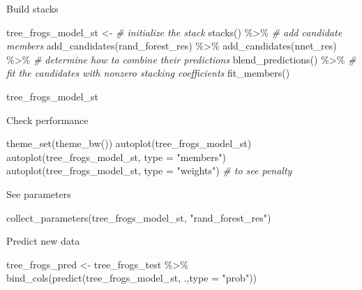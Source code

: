 \documentclass[
]{book}
\newenvironment{Shaded}{\begin{snugshade}}{\end{snugshade}}
\newcommand{\AttributeTok}[1]{\textcolor[rgb]{0.77,0.63,0.00}{#1}}
\newcommand{\CommentTok}[1]{\textcolor[rgb]{0.56,0.35,0.01}{\textit{#1}}}
\newcommand{\FunctionTok}[1]{\textcolor[rgb]{0.00,0.00,0.00}{#1}}
\newcommand{\NormalTok}[1]{#1}
\newcommand{\OtherTok}[1]{\textcolor[rgb]{0.56,0.35,0.01}{#1}}
\newcommand{\SpecialCharTok}[1]{\textcolor[rgb]{0.00,0.00,0.00}{#1}}
\newcommand{\StringTok}[1]{\textcolor[rgb]{0.31,0.60,0.02}{#1}}
\begin{document}
Build stacks

\begin{Shaded}
\begin{Highlighting}[]
\NormalTok{tree\_frogs\_model\_st }\OtherTok{\textless{}{-}}
    \CommentTok{\# initialize the stack}
    \FunctionTok{stacks}\NormalTok{() }\SpecialCharTok{\%\textgreater{}\%}
    \CommentTok{\# add candidate members}
    \FunctionTok{add\_candidates}\NormalTok{(rand\_forest\_res) }\SpecialCharTok{\%\textgreater{}\%}
    \FunctionTok{add\_candidates}\NormalTok{(nnet\_res) }\SpecialCharTok{\%\textgreater{}\%}
    \CommentTok{\# determine how to combine their predictions}
    \FunctionTok{blend\_predictions}\NormalTok{() }\SpecialCharTok{\%\textgreater{}\%}
    \CommentTok{\# fit the candidates with nonzero stacking coefficients}
    \FunctionTok{fit\_members}\NormalTok{()}

\NormalTok{tree\_frogs\_model\_st}
\end{Highlighting}
\end{Shaded}

Check performance

\begin{Shaded}
\begin{Highlighting}[]
\FunctionTok{theme\_set}\NormalTok{(}\FunctionTok{theme\_bw}\NormalTok{())}
\FunctionTok{autoplot}\NormalTok{(tree\_frogs\_model\_st)}
\FunctionTok{autoplot}\NormalTok{(tree\_frogs\_model\_st, }\AttributeTok{type =} \StringTok{"members"}\NormalTok{)}
\FunctionTok{autoplot}\NormalTok{(tree\_frogs\_model\_st, }\AttributeTok{type =} \StringTok{"weights"}\NormalTok{) }\CommentTok{\# to see penalty}
\end{Highlighting}
\end{Shaded}

See parameters

\begin{Shaded}
\begin{Highlighting}[]
\FunctionTok{collect\_parameters}\NormalTok{(tree\_frogs\_model\_st, }\StringTok{"rand\_forest\_res"}\NormalTok{)}
\end{Highlighting}
\end{Shaded}

Predict new data

\begin{Shaded}
\begin{Highlighting}[]
\NormalTok{tree\_frogs\_pred }\OtherTok{\textless{}{-}}
\NormalTok{    tree\_frogs\_test }\SpecialCharTok{\%\textgreater{}\%}
    \FunctionTok{bind\_cols}\NormalTok{(}\FunctionTok{predict}\NormalTok{(tree\_frogs\_model\_st, .,}\AttributeTok{type =} \StringTok{"prob"}\NormalTok{))}
\end{Highlighting}
\end{Shaded}
\end{document}
